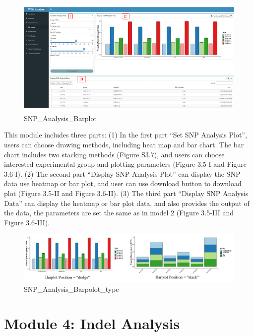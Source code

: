 \documentclass[
]{book}
\theoremstyle{definition}
\theoremstyle{definition}
\theoremstyle{definition}
\theoremstyle{definition}
\theoremstyle{remark}
\begin{document}
\begin{figure}
\includegraphics[width=1\linewidth]{figure/2.SNP_Analysis_barplot_1} \caption{SNP_Analysis_Barplot}\label{fig:unnamed-chunk-11}
\end{figure}

This module includes three parts: (1) In the first part ``Set SNP Analysis Plot'', users can choose drawing methods, including heat map and bar chart. The bar chart includes two stacking methods (Figure S3.7), and users can choose interested experimental group and plotting parameters (Figure 3.5-I and Figure 3.6-I). (2) The second part ``Display SNP Analysis Plot'' can display the SNP data use heatmap or bar plot, and user can use download button to download plot (Figure 3.5-II and Figure 3.6-II). (3) The third part ``Display SNP Analysis Data'' can display the heatmap or bar plot data, and also provides the output of the data, the parameters are set the same as in model 2 (Figure 3.5-III and Figure 3.6-III).

\begin{figure}
\includegraphics[width=1\linewidth]{figure/2.SNP_Analysis_barplot_ALL_type} \caption{SNP_Analysis_Barpolot_type}\label{fig:unnamed-chunk-12}
\end{figure}

\hypertarget{module-4-indel-analysis}{%
\section{Module 4: Indel Analysis}\label{module-4-indel-analysis}}
\end{document}
